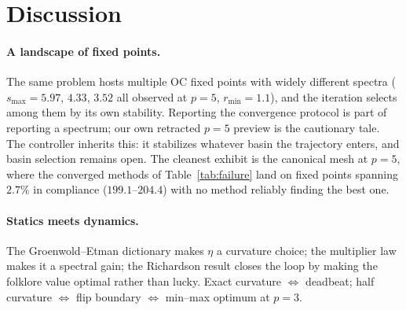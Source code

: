\documentclass[11pt,a4paper]{article}
\newcommand{\smax}{s_{\max}}
\begin{document}
\section{Discussion}\label{sec:discussion}

\paragraph{A landscape of fixed points.} The same problem hosts multiple
OC fixed points with widely different spectra ($\smax=5.97$, $4.33$,
$3.52$ all observed at $p=5$, $r_{\min}=1.1$), and the iteration selects
among them by its own stability. Reporting the convergence protocol is
part of reporting a spectrum; our own retracted $p=5$ preview is the
cautionary tale. The controller inherits this: it stabilizes whatever
basin the trajectory enters, and basin selection remains open. The
cleanest exhibit is the canonical mesh at $p=5$, where the converged
methods of Table~\ref{tab:failure} land on fixed points spanning
$2.7\%$ in compliance ($199.1$--$204.4$) with no method reliably
finding the best one.

\paragraph{Statics meets dynamics.} The Groenwold--Etman dictionary
makes $\eta$ a curvature choice; the multiplier law makes it a spectral
gain; the Richardson result closes the loop by making the folklore value
optimal rather than lucky. Exact curvature $\Leftrightarrow$ deadbeat;
half curvature $\Leftrightarrow$ flip boundary $\Leftrightarrow$
min--max optimum at $p=3$.
\end{document}
